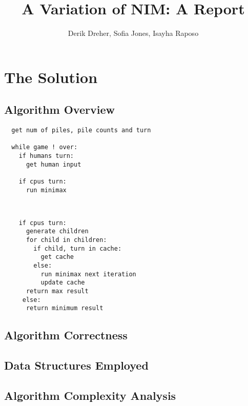 \documentclass{article}
\begin{document}
\begin{titlepage}
\title{A Variation of NIM: A Report}
\author{Derik Dreher, Sofia Jones, Isayha Raposo}
\maketitle
\thispagestyle{empty}
\end{titlepage}

\rhead{\today}

\section*{The Solution}
\subsection*{Algorithm Overview}
\begin{verbatim}
  get num of piles, pile counts and turn
  
  while game ! over:
    if humans turn:
      get human input
      
    if cpus turn: 
      run minimax
      
      
\end{verbatim}

\begin{verbatim}
    if cpus turn: 
      generate children
      for child in children:
        if child, turn in cache:
          get cache
        else: 
          run minimax next iteration
          update cache
      return max result
     else:
      return minimum result
\end{verbatim}

\subsection*{Algorithm Correctness}
\subsection*{Data Structures Employed}
\subsection*{Algorithm Complexity Analysis}
\end{document}
